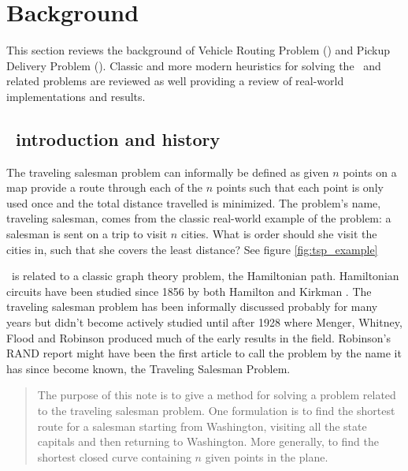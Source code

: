 
\chapter{Background}
This section reviews the background of Vehicle Routing Problem (\VRP) and Pickup Delivery Problem (\PDP). Classic and more modern heuristics for solving the \VRP\ and related problems are reviewed as well providing a review of real-world implementations and results. 

\section{\TSP\ introduction and history}
The traveling salesman problem can informally be defined as given $n$ points on a map provide a route through each of the $n$ points such that each point is only used once and the total distance travelled is minimized. The problem's name, traveling salesman, comes from the classic real-world example of the problem: a salesman is sent on a trip to visit $n$ cities. What is order should she visit the cities in, such that she covers the least distance? See figure \ref{fig:tsp_example}


\TSP\ is related to a classic graph theory problem, the Hamiltonian path. Hamiltonian circuits have been studied since 1856 by both Hamilton \cite{Hamilton:1856} and Kirkman \cite{Kirkman:1856}. The traveling salesman problem has been informally discussed probably for many years \cite{Schrijver} but didn't become actively studied until after 1928 where Menger, Whitney, Flood and Robinson produced much of the early results in the field. Robinson's RAND report \cite{Robinson:1949} might have been the first article to call the problem by the name it has since become known, the Traveling Salesman Problem.  

\begin{quote}
  The purpose of this note is to give a method for solving a problem related to the traveling salesman problem. One formulation is to find the shortest route for a salesman starting from Washington, visiting all the state capitals and then returning to Washington. More generally, to find the shortest closed curve containing $n$ given points in the plane.
\end{quote}

